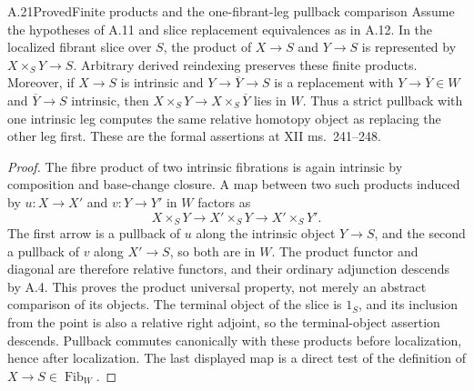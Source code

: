 \begin{claim}{A.21}{Proved}{Finite products and the one-fibrant-leg pullback comparison}
Assume the hypotheses of A.11 and slice replacement equivalences as in A.12. In the localized fibrant slice over $S$, the product of $X\to S$ and $Y\to S$ is represented by $X\times_S Y\to S$. Arbitrary derived reindexing preserves these finite products. Moreover, if $X\to S$ is intrinsic and $Y\to\overline Y\to S$ is a replacement with $Y\to\overline Y\in W$ and $\overline Y\to S$ intrinsic, then $X\times_S Y\to X\times_S\overline Y$ lies in $W$. Thus a strict pullback with one intrinsic leg computes the same relative homotopy object as replacing the other leg first. These are the formal assertions at XII ms.~241--248.
\end{claim}
\begin{proof}
The fibre product of two intrinsic fibrations is again intrinsic by composition and base-change closure. A map between two such products induced by $u:X\to X'$ and $v:Y\to Y'$ in $W$ factors as
\[
X\times_SY\longrightarrow X'\times_SY
 \longrightarrow X'\times_SY'.
\]
The first arrow is a pullback of $u$ along the intrinsic object $Y\to S$, and the second a pullback of $v$ along $X'\to S$, so both are in $W$. The product functor and diagonal are therefore relative functors, and their ordinary adjunction descends by A.4. This proves the product universal property, not merely an abstract comparison of its objects. The terminal object of the slice is $1_S$, and its inclusion from the point is also a relative right adjoint, so the terminal-object assertion descends. Pullback commutes canonically with these products before localization, hence after localization. The last displayed map is a direct test of the definition of $X\to S\in\operatorname{Fib}_W$.
\end{proof}

